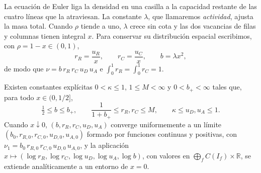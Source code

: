 La ecuación de Euler liga la densidad en una casilla a la capacidad restante de
las cuatro líneas que la atraviesan. La constante $\lambda$, que llamaremos \emph{actividad}, ajusta la masa total.
Cuando $\rho$ tiende a uno, $\lambda$ crece sin cota y las dos vacancias de filas y
columnas tienen integral $x$. Para conservar su distribución espacial escribimos,
con $\rho=1-x\in(0,1)$,
\begin{equation}\label{eq:reescala}
 r_R=\frac{u_R}x,\qquad r_C=\frac{u_C}x,\qquad b=\lambda x^2,
\end{equation}
de modo que $\nu=b\,r_R\,r_C\,u_D\,u_A$ e $\int_0^1r_R=\int_0^1r_C=1$.

\begin{teorema}\label{thm:lleno}
Existen constantes explícitas $0<\kappa\le1$, $1\le M<\infty$ y $0<b_+<\infty$ tales que, para
todo $x\in(0,1/2]$,
\[
 \tfrac12\le b\le b_+,\qquad \frac1{1+b_+}\le r_R,r_C\le M,\qquad \kappa\le u_D,u_A\le1 .
\]
Cuando $x\downarrow0$, $(b,r_R,r_C,u_D,u_A)$ converge uniformemente a un límite
$(b_0,r_{R,0},r_{C,0},u_{D,0},u_{A,0})$ formado por funciones continuas y positivas, con
$\nu_1=b_0\,r_{R,0}\,r_{C,0}\,u_{D,0}\,u_{A,0}$, y la aplicación
$x\mapsto(\log r_R,\log r_C,\log u_D,\log u_A,\log b)$, con valores en
$\bigoplus_fC(I_f)\times\mathbb R$, se extiende analíticamente a un entorno de $x=0$.
\end{teorema}
